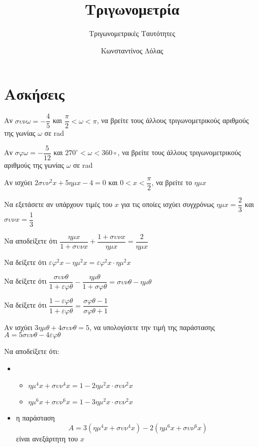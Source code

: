 \documentclass{../presentation}
\title{Τριγωνομετρία}
\subtitle{Τριγωνομετρικές Ταυτότητες}
\author[Λόλας]{Κωνσταντίνος Λόλας}
\date{}
\begin{document}
\begin{frame}
  \titlepage
\end{frame}

\section{Ασκήσεις}

\begin{askisi}
  Αν $συνω=-\dfrac{4}{5}$ και $\dfrac{π}{2}<ω<π$, να βρείτε τους άλλους τριγωνομετρικούς αριθμούς της γωνίας $ω$ σε rad
\end{askisi}

\begin{askisi}
  Αν $σφω=-\dfrac{5}{12}$ και $270^{\circ}<ω<360{\circ}$, να βρείτε τους άλλους τριγωνομετρικούς αριθμούς της γωνίας $ω$ σε rad
\end{askisi}

\begin{askisi}
  Αν ισχύει $2συν^2x+5ημx-4=0$ και $0<x<\dfrac{π}{2}$, να βρείτε το $ημx$
\end{askisi}

\begin{askisi}
  Να εξετάσετε αν υπάρχουν τιμές του $x$ για τις οποίες ισχύει συγχρόνως $ημx=\dfrac{2}{3}$ και $συνx=\dfrac{1}{3}$
\end{askisi}

\begin{askisi}
  Να αποδείξετε ότι $\dfrac{ημx}{1+συνx}+\dfrac{1+συνx}{ημx}=\dfrac{2}{ημx}$
\end{askisi}

\begin{askisi}
  Να δείξετε ότι $εφ^2x-ημ^2x=εφ^2x\cdot ημ^2x$
\end{askisi}

\begin{askisi}
  Να δείξετε ότι $\dfrac{συνθ}{1+εφθ}-\dfrac{ημθ}{1+σφθ}=συνθ-ημθ$
\end{askisi}

\begin{askisi}
  Να δείξετε ότι $\dfrac{1-εφθ}{1+εφθ}=\dfrac{σφθ-1}{σφθ+1}$
\end{askisi}

\begin{askisi}
  Αν ισχύει $3ημθ+4συνθ=5$, να υπολογίσετε την τιμή της παράστασης $Α=5συνθ-4εφθ$
\end{askisi}

\begin{askisi}
  Να αποδείξετε ότι:
  \begin{itemize}
    \item \begin{itemize}
            \item $ημ^4x+συν^4x=1-2ημ^2x\cdot συν^2x$
            \item $ημ^6x+συν^6x=1-3ημ^2x\cdot συν^2x$
          \end{itemize}
    \item η παράσταση
          $$Α=3(ημ^4x+συν^4x)-2(ημ^6x+συν^6x)$$
          είναι ανεξάρτητη του $x$
  \end{itemize}
\end{askisi}
\end{document}
